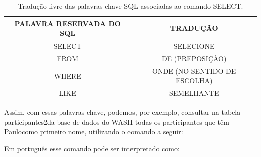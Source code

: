 \documentclass[
12pt,		%
openright,	%
twoside,  %
a4paper,			%
chapter=TITLE,		%
english,			%
french,				%
spanish,			%
brazil				%
]{USPSC-classe/USPSC}
\begin{document}
\begin{table}[htb]
\tiny
\caption{\label{0faf6421bd5dff6b3cb8bedd3f0b4212f1150970}Tradu\c{c}\~ao livre das palavras chave SQL associadas ao comando SELECT.}

\centering
\begin{tabular}{|c|c|}
\hline
PALAVRA RESERVADA DO SQL  &  TRADU\c{C}\~AO \\
\hline
SELECT  &  SELECIONE \\
FROM  &  DE (PREPOSI\c{C}\~AO) \\
WHERE  &  ONDE (NO SENTIDO DE ESCOLHA) \\
LIKE  &  SEMELHANTE \\
\hline
\end{tabular}
\end{table}


Assim, com essas palavras chave, podemos, por exemplo, consultar na tabela \textquotedbl participantes2\textquotedbl   da base de dados do WASH todas os participantes que t\^em \textquotedbl Paulo\textquotedbl  como primeiro nome, utilizando o comando a seguir:


















\noindent\begin{center}\mbox{\centering{}}\end{center}


Em portugu\^es esse comando pode ser interpretado como:


















\noindent\begin{center}\mbox{\centering{}}\end{center}
\end{document}

